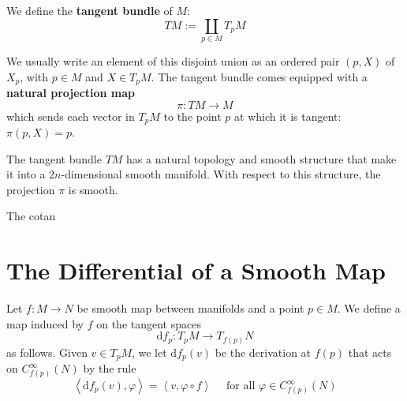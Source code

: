 \documentclass[12pt, oneside]{book}
\begin{document}
\begin{definition}
    We define the \textbf{tangent bundle} of $M$:
    \begin{equation*}
        T M
        :=
        \coprod_{p \in M} T_p M
    \end{equation*}
    \begin{remark}
        We usually write an element of this disjoint union as an ordered pair $(p, X)$ of $X_p$, with $p \in M$ and $X \in T_p M$. The tangent bundle comes equipped with a \textbf{natural projection map}
        \begin{equation*}
            \pi: T M \rightarrow M
        \end{equation*}
        which sends each vector in $T_p M$ to the point $p$ at which it is tangent: $\pi(p, X)=p$.
    \end{remark}
\end{definition}

\begin{proposition}
    The tangent bundle $T M$ has a natural topology and smooth structure that make it into a
    $2 n$-dimensional smooth manifold.
    With respect to this structure, the projection $\pi$ is smooth.
\end{proposition}

\begin{definition}
    The cotan
\end{definition}







\section{The Differential of a Smooth Map}
\begin{definition}
    Let $f:M \rightarrow N$ be smooth map between manifolds and a point $p\in M$.
    We define a map induced by $f$ on the tangent spaces
    \begin{equation*}
        \mathrm{d} f_p: T_p M \rightarrow T_{f(p)} N
    \end{equation*}
    as follows.
    Given $v \in T_p M$, we let $\mathrm{d} f_p(v)$ be the derivation at $f(p)$ that acts on $C^{\infty}_{f(p)}(N)$ by the rule
    \begin{equation*}
        \left\langle \mathrm{d} f_p(v),  \varphi \right\rangle
        =
        \left\langle  v,  \varphi \circ f \right\rangle \quad \text{ for all } \varphi \in C_{f(p)}^\infty(N)
    \end{equation*}
\end{definition}
\end{document}
